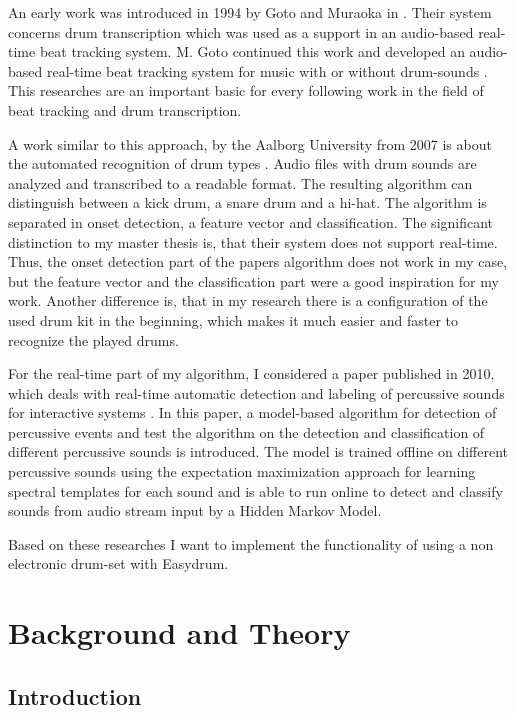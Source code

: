 An early work was introduced in 1994 by Goto and Muraoka in \autocite[]{Goto:1994}. Their system concerns drum transcription which was used as a support in an audio-based real-time beat tracking system. M. Goto continued this work and developed an audio-based real-time beat tracking system for music with or without drum-sounds \autocite[]{Goto:2001}. This researches are an important basic for every following work in the field of beat tracking and drum transcription.

A work similar to this approach, by the Aalborg University from 2007 is about the automated recognition of drum types \autocite[]{Christophersen:2007}. Audio files with drum sounds are analyzed and transcribed to a readable format. The resulting algorithm can distinguish between a kick drum, a snare drum and a hi-hat. The algorithm is separated in onset detection, a feature vector and classification. The significant distinction to my master thesis is, that their system does not support real-time. Thus, the onset detection part of the papers algorithm does not work in my case, but the feature vector and the classification part were a good inspiration for my work. Another difference is, that in my research there is a configuration of the used drum kit in the beginning, which makes it much easier and faster to recognize the played drums.

For the real-time part of my algorithm, I considered a paper published in 2010, which deals with real-time automatic detection and labeling of percussive sounds for interactive systems \autocite[]{Simsekli:2011}. In this paper, a model-based algorithm for detection of percussive events and test the algorithm on the detection and classification of different percussive sounds is introduced. The model is trained offline on different percussive sounds using the expectation maximization approach for learning spectral templates for each sound and is able to run online to detect and classify sounds from audio stream input by a Hidden Markov Model.

Based on these researches I want to implement the functionality of using a non electronic drum-set with Easydrum.

\section{Background and Theory}

\subsection{Introduction}

